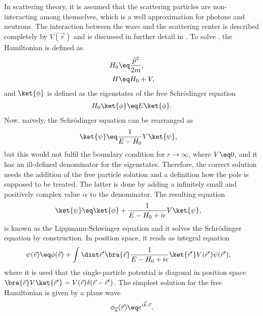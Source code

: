 \documentclass[\main/dresen_thesis.tex]{subfiles}
\begin{document}
In scattering theory, it is assumed that the scattering particles are non-interacting among themselves, which is a well approximation for photons and neutrons.
The interaction between the wave and the scattering center is described completely by $V(\vec{r})$ and is discussed in further detail in .
To solve , the Hamiltonian is defined as
\begin{align}
  H_0 &\eq \frac{\hat{p}^2}{2m},\\
  H &\eq H_0 + V,
\end{align}
and $\ket{\phi}$ is defined as the eigenstates of the free Schr\"odinger equation
\begin{align}
  H_0 \ket{\phi} &\eq E \ket{\phi}.\\
\end{align}
Now, naively, the Schr\"odinger equation can be rearranged as
\begin{align}
  \ket{\psi} &\eq \frac{1}{E - H_0} V \ket{\psi},
\end{align}
but this would not fulfil the boundary condition for $r \rightarrow \infty$, where $V\eq0$, and it has an ill-defined denominator for the eigenstates.
Therefore, the correct solution needs the addition of the free particle solution and a definition how the pole is supposed to be treated.
The latter is done by adding a infinitely small and positively complex value $i\epsilon$ to the denominator. The resulting equation
\begin{align}
  \ket{\psi} &\eq \ket{\phi} +  \frac{1}{E - H_0 + i \epsilon} V \ket{\psi},
\end{align}
is known as the Lippmann-Schwinger equation and  it solves the Schr\"odinger equation by construction.
In position space, it reads as integral equation
\begin{align}
  \psi (\vec{r}) &\eq \phi(\vec{r}) + \int \dint \vec{r}^\prime \bra{\vec{r}}\frac{1}{E - H_0 + i \epsilon} \ket{\vec{r}^\prime} V (\vec{r}^\prime)\psi (\vec{r}^\prime),
  \label{eq:theoreticalBackground:scattering:scatteringTheory:LippmanSchwingerIntegralEquation}
\end{align}
where it is used that the single-particle potential is diagonal in position space $\bra{\vec{r}} V \ket{\vec{r}^\prime} = V(\vec{r}) \delta(\vec{r} - \vec{r}^\prime)$.
The simplest solution for the free Hamiltonian is given by a plane wave
\begin{align}
  \phi_{\vec{k}}(\vec{r}) \eq e^{i\vec{k} \cdot \vec{r}}.
\end{align}
\end{document}
